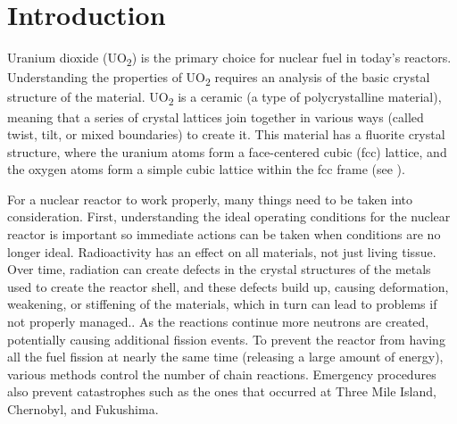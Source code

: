 \documentclass[twoside,senior]{BYUPhys}
\begin{document}
 \frontmatter

 \makepreliminarypages

 \singlespace

 \tableofcontents
 \clearemptydoublepage

 \listoffigures
 \clearemptydoublepage

 \doublespace

 \mainmatter


\chapter{Introduction\label{intro}}
Uranium dioxide (UO\textsubscript{2}) is the primary choice for nuclear fuel in today's reactors.\cite{uraniumInfo}  Understanding the properties of UO\textsubscript{2} requires an analysis of the basic crystal structure of the material.  UO\textsubscript{2} is a ceramic (a type of polycrystalline material), meaning that a series of crystal lattices join together in various ways (called twist, tilt, or mixed boundaries) to create it.  This material has a fluorite crystal structure, where the uranium atoms form a face-centered cubic (fcc) lattice, and the oxygen atoms form a simple cubic lattice within the fcc frame (see ).

For a nuclear reactor to work properly, many things need to be taken into consideration.  First, understanding the ideal operating conditions for the nuclear reactor is important so immediate actions can be taken when conditions are no longer ideal.  Radioactivity has an effect on all materials, not just living tissue.  Over time, radiation can create defects in the crystal structures of the metals used to create the reactor shell, and these defects build up, causing deformation, weakening, or stiffening of the materials, which in turn can lead to problems if not properly managed.\cite{callister2003}.  As the reactions continue more neutrons are created, potentially causing additional fission events.  To prevent the reactor from having all the fuel fission at nearly the same time (releasing a large amount of energy), various methods control the number of chain reactions.  Emergency procedures also prevent catastrophes such as the ones that occurred at Three Mile Island, Chernobyl, and Fukushima.
\end{document}
